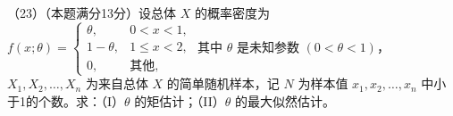 \documentclass[UTF8,12pt]{ctexart}
\begin{document}
（23）（本题满分13分）设总体 \(\displaystyle X\) 的概率密度为 \(\displaystyle f(x;\theta)=\begin{cases}\theta,\allowbreak &0<x<1,\allowbreak \\1-\theta,\allowbreak &1\le x<2,\allowbreak \\0,\allowbreak &\text{其他},\allowbreak \end{cases}\) 其中 \(\displaystyle \theta\) 是未知参数 \(\displaystyle (0<\theta<1)\)，\(\displaystyle X_1,\allowbreak X_2,\allowbreak \ldots,\allowbreak X_n\) 为来自总体 \(\displaystyle X\) 的简单随机样本，记 \(\displaystyle N\) 为样本值 \(\displaystyle x_1,\allowbreak x_2,\allowbreak \ldots,\allowbreak x_n\) 中小于1的个数。求：（I）\(\displaystyle \theta\) 的矩估计；（II）\(\displaystyle \theta\) 的最大似然估计。
\end{document}
